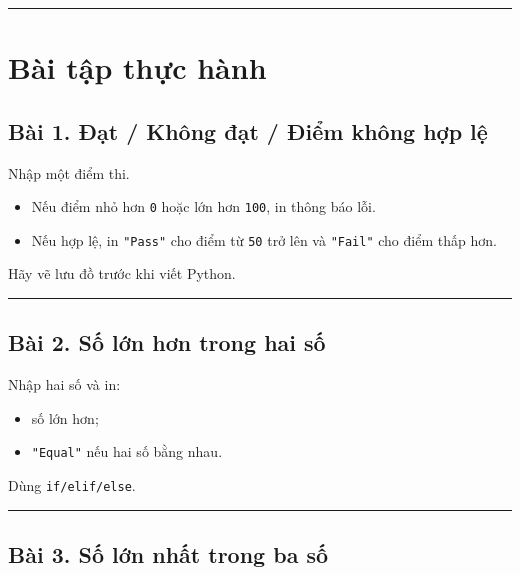 \documentclass[
  11pt,
  a4paper,
]{article}
\providecommand{\tightlist}{%
  \setlength{\itemsep}{0pt}\setlength{\parskip}{0pt}}
\begin{document}
\begin{center}\rule{0.5\linewidth}{0.5pt}\end{center}

\section{Bài tập thực hành}\label{buxe0i-tux1eadp-thux1ef1c-huxe0nh}

\subsection{Bài 1. Đạt / Không đạt / Điểm không hợp
lệ}\label{buxe0i-1.-ux111ux1ea1t-khuxf4ng-ux111ux1ea1t-ux111iux1ec3m-khuxf4ng-hux1ee3p-lux1ec7}

Nhập một điểm thi.

\begin{itemize}
\tightlist
\item
  Nếu điểm nhỏ hơn \texttt{0} hoặc lớn hơn \texttt{100}, in thông báo
  lỗi.
\item
  Nếu hợp lệ, in \texttt{"Pass"} cho điểm từ \texttt{50} trở lên và
  \texttt{"Fail"} cho điểm thấp hơn.
\end{itemize}

Hãy vẽ lưu đồ trước khi viết Python.

\begin{center}\rule{0.5\linewidth}{0.5pt}\end{center}

\subsection{Bài 2. Số lớn hơn trong hai
số}\label{buxe0i-2.-sux1ed1-lux1edbn-hux1a1n-trong-hai-sux1ed1}

Nhập hai số và in:

\begin{itemize}
\tightlist
\item
  số lớn hơn;
\item
  \texttt{"Equal"} nếu hai số bằng nhau.
\end{itemize}

Dùng \texttt{if/elif/else}.

\begin{center}\rule{0.5\linewidth}{0.5pt}\end{center}

\subsection{Bài 3. Số lớn nhất trong ba
số}\label{buxe0i-3.-sux1ed1-lux1edbn-nhux1ea5t-trong-ba-sux1ed1}
\end{document}
